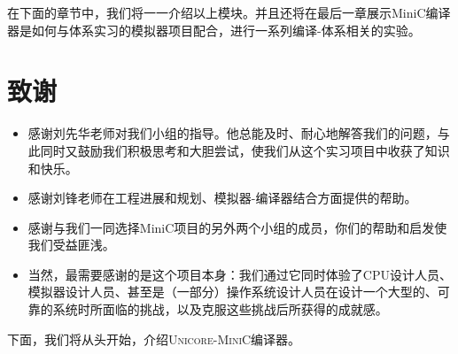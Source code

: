 在下面的章节中，我们将一一介绍以上模块。并且还将在最后一章展示MiniC编译器是如何与体系实习的模拟器项目配合，进行一系列编译-体系相关的实验。

\section*{致谢}
\begin{itemize}
\item 感谢刘先华老师对我们小组的指导。他总能及时、耐心地解答我们的问题，与此同时又鼓励我们积极思考和大胆尝试，使我们从这个实习项目中收获了知识和快乐。

\item 感谢刘锋老师在工程进展和规划、模拟器-编译器结合方面提供的帮助。

\item 感谢与我们一同选择MiniC项目的另外两个小组的成员，你们的帮助和启发使我们受益匪浅。

\item 当然，最需要感谢的是这个项目本身：我们通过它同时体验了CPU设计人员、模拟器设计人员、甚至是（一部分）操作系统设计人员在设计一个大型的、可靠的系统时所面临的挑战，以及克服这些挑战后所获得的成就感。
\end{itemize}

下面，我们将从头开始，介绍\textsc{Unicore-MiniC}编译器。

